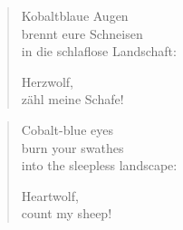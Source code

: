 
\cleartorecto


\begin{verse}
Kobaltblaue Augen\\
brennt eure Schneisen\\
in die schlaflose Landschaft:

Herzwolf,\\
zähl meine Schafe!
\end{verse}

\cleartoverso


\begin{verse}
Cobalt-blue eyes\\
burn your swathes\\
into the sleepless landscape:

Heartwolf,\\
count my sheep!
\end{verse}

